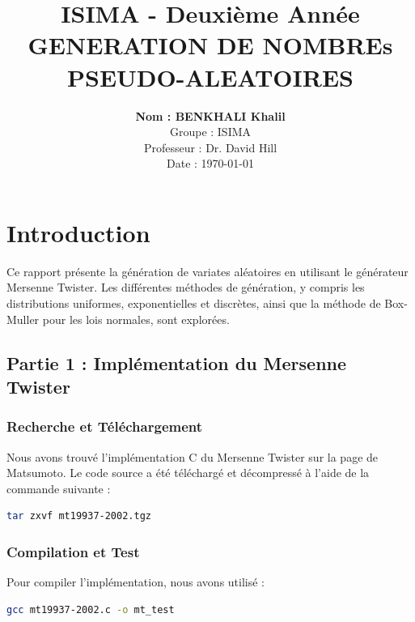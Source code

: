 \documentclass[a4paper,12pt]{report}
\title{
    \textbf{ISIMA - Deuxième Année}\\
    \vspace{1cm}
    \Huge GENERATION DE NOMBREs PSEUDO-ALEATOIRES
}
\author{
    \textbf{Nom : BENKHALI Khalil}\\
    Groupe : ISIMA \\
    Professeur : Dr. David Hill \\
    Date : \today
}
\date{}
\begin{document}
\maketitle %

\newpage

\tableofcontents

\newpage

\chapter*{Introduction} %
Ce rapport présente la génération de variates aléatoires en utilisant le générateur Mersenne Twister. Les différentes méthodes de génération, y compris les distributions uniformes, exponentielles et discrètes, ainsi que la méthode de Box-Muller pour les lois normales, sont explorées.

\newpage
\section*{Partie 1 : Implémentation du Mersenne Twister}

\subsection*{Recherche et Téléchargement}
Nous avons trouvé l'implémentation C du Mersenne Twister sur la page de Matsumoto. Le code source a été téléchargé et décompressé à l'aide de la commande suivante :

\begin{lstlisting}[language=bash]
tar zxvf mt19937-2002.tgz
\end{lstlisting}

\subsection*{Compilation et Test}
Pour compiler l'implémentation, nous avons utilisé :

\begin{lstlisting}[language=bash]
gcc mt19937-2002.c -o mt_test
\end{lstlisting}
\end{document}
